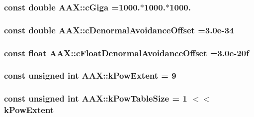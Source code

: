 \subsubsection[{c\+Giga}]{\setlength{\rightskip}{0pt plus 5cm}const double A\+A\+X\+::c\+Giga =1000.$\ast$1000.$\ast$1000.}\label{a00288_ae5910a5df81de70f784c2fd073f70422}
\hypertarget{a00288_a5c2e1bff2891a4b11252759e152cf520}{}
\subsubsection[{c\+Denormal\+Avoidance\+Offset}]{\setlength{\rightskip}{0pt plus 5cm}const double A\+A\+X\+::c\+Denormal\+Avoidance\+Offset =3.\+0e-\/34}\label{a00288_a5c2e1bff2891a4b11252759e152cf520}
\hypertarget{a00288_ae3a66eee97cfe006ffbf11f901ddd286}{}
\subsubsection[{c\+Float\+Denormal\+Avoidance\+Offset}]{\setlength{\rightskip}{0pt plus 5cm}const float A\+A\+X\+::c\+Float\+Denormal\+Avoidance\+Offset =3.\+0e-\/20f}\label{a00288_ae3a66eee97cfe006ffbf11f901ddd286}
\hypertarget{a00288_a4e6fcac015bb083018e8897563966cf6}{}
\subsubsection[{k\+Pow\+Extent}]{\setlength{\rightskip}{0pt plus 5cm}const unsigned int A\+A\+X\+::k\+Pow\+Extent = 9}\label{a00288_a4e6fcac015bb083018e8897563966cf6}
\hypertarget{a00288_a59f1ab59ea51ed94f87e8d935870df9e}{}
\subsubsection[{k\+Pow\+Table\+Size}]{\setlength{\rightskip}{0pt plus 5cm}const unsigned int A\+A\+X\+::k\+Pow\+Table\+Size = 1 $<$$<$ {\bf k\+Pow\+Extent}}\label{a00288_a59f1ab59ea51ed94f87e8d935870df9e}
\hypertarget{a00288_a0c975151f0d47cc80eef9ff5a7c80125}{}
